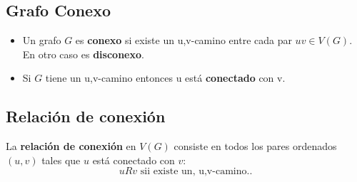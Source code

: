 \documentclass[a4paper]{book}
\begin{document}
\subsection{Grafo Conexo}
\label{ssec:grafo_conexo}

\begin{itemize}
    \item Un grafo \(G\) es \textbf{conexo} si existe un u,v-camino entre cada
        par \(uv\in V\left( G \right)\). En otro caso es \textbf{disconexo}.
    \item  Si \(G\) tiene un u,v-camino entonces u está \textbf{conectado} con
        v.
\end{itemize}

\subsection{Relación de conexión}
\label{ssec:relacion_de_conexion}

La \textbf{relación de conexión} en \(V\left(G\right)\) consiste en todos los pares ordenados \(\left(u,v \right)\) tales que \(u\) está conectado con \(v\):
\[
uRv\text{ sii existe un, u,v-camino.}
.\]
\end{document}
